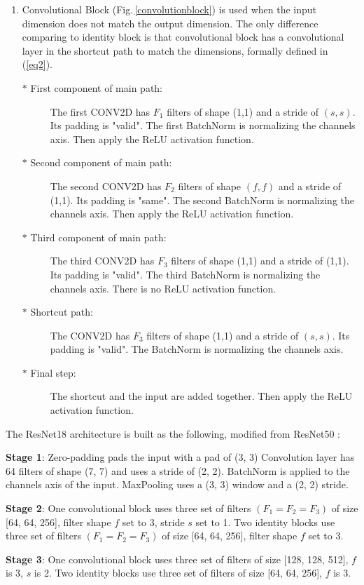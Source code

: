 \begin{enumerate}
\item  Convolutional Block (Fig.\,\ref{convolutionblock}) is used when the input dimension does not match the output dimension. The only difference comparing to identity block is that convolutional block has a convolutional layer in the shortcut path to match the dimensions, formally defined in (\ref{eq2}).
    \begin{description}
      \item[$\ast$ First component of main path:] The first CONV2D has $F_1$ filters of shape (1,1) and a stride of $(s,s)$. Its padding is "valid". The first BatchNorm is normalizing the channels axis. Then apply the ReLU activation function. 
      \item[$\ast$ Second component of main path:] The second CONV2D has $F_2$ filters of shape $(f,f)$ and a stride of (1,1). Its padding is "same". The second BatchNorm is normalizing the channels axis. Then apply the ReLU activation function. 
      \item[$\ast$ Third component of main path:] The third CONV2D has $F_3$ filters of shape (1,1) and a stride of (1,1). Its padding is "valid". The third BatchNorm is normalizing the channels axis. There is no ReLU activation function.
      \item[$\ast$ Shortcut path:] The CONV2D has $F_3$ filters of shape (1,1) and a stride of $(s,s)$. Its padding is "valid". The BatchNorm is normalizing the channels axis. 
      \item[$\ast$ Final step:] The shortcut and the input are added together. Then apply the ReLU activation function.
    \end{description}
\end{enumerate}

The ResNet18 architecture is built as the following, modified from ResNet50 \citep{resnet50keras}:

\textbf{Stage 1}:
Zero-padding pads the input with a pad of (3, 3)
Convolution layer has 64 filters of shape (7, 7) and uses a stride of (2, 2).
BatchNorm is applied to the channels axis of the input.
MaxPooling uses a (3, 3) window and a (2, 2) stride.

\textbf{Stage 2}:
One convolutional block uses three set of filters $(F_1=F_2=F_3)$ of size [64, 64, 256], filter shape $f$ set to 3, stride $s$ set to 1.
Two identity blocks use three set of filters $(F_1=F_2=F_3)$ of size [64, 64, 256], filter shape $f$ set to 3.

\textbf{Stage 3}:
One convolutional block uses three set of filters of size [128, 128, 512], $f$ is 3, $s$ is 2.
Two identity blocks use three set of filters of size [64, 64, 256], $f$ is 3.

